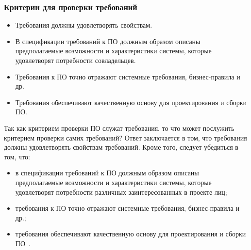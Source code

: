 \documentclass{../industrial-development}
\begin{document}
{%
\begin{frame} \frametitle {Критерии для проверки
требований}
\begin{itemize}
\item Требования должны удовлетворять
свойствам.
\item В спецификации требований к ПО должным
образом описаны предполагаемые
возможности и характеристики системы,
которые удовлетворят потребности
совладельцев.
\item Требования к ПО точно отражают системные
требования, бизнес-правила и др.
\item Требования обеспечивают качественную
основу для проектирования и сборки ПО.
\end{itemize}
\end{frame}

\lecturenotes

Так как критерием проверки ПО служат требования, то что может послужить критерием проверки самих требований? Ответ заключается в том, что
требования должны удовлетворять свойствам требований. Кроме того,
следует убедиться в том, что:
\begin{itemize}
\item в спецификации требований к ПО должным образом описаны предполагаемые
возможности и характеристики системы, которые удовлетворят потребности
различных заинтересованных в проекте лиц;
\item требования к ПО точно отражают системные требования, бизнес-правила и др.;
\item требования обеспечивают качественную основу для проектирования и сборки ПО~\cite[с.~64]{Maglinec}.
\end{itemize}


}
\end{document}
